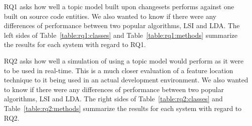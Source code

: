 
RQ1 asks how well a topic model built upon changesets performs against
one built on source code entities.
We also wanted to know if there were any differences of performance
between two popular algorithms, LSI and LDA.
The left sides of Table~\ref{table:rq1:classes} and Table~\ref{table:rq1:methods}
summarize the results for each system with regard to RQ1.

RQ2 asks how well a simulation of using a topic model would perform as
it were to be used in real-time.
This is a much closer evaluation of a feature location technique to it
being used in an actual development environment.
We also wanted to know if there were any differences of performance
between two popular algorithms, LSI and LDA.
The right sides of Table~\ref{table:rq2:classes} and Table~\ref{table:rq2:methods}
summarize the results for each system with regard to RQ2.

